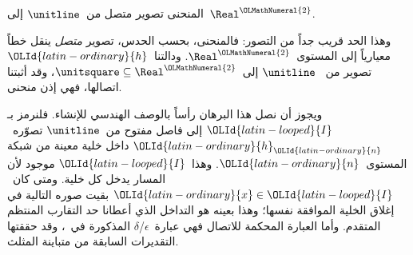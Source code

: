 \documentclass[../../../include/open-logic-section]{subfiles}
\begin{document}
\begin{defn}
المنحنى تصوير متصل من~$\unitline$ إلى~$\Real^{\OLMathNumeral{2}}$.
\end{defn}

وهذا الحد قريب جداً من التصور: فالمنحنى، بحسب الحدس، تصوير \emph{متصل}
ينقل خطاً معيارياً إلى المستوى~$\Real^{\OLMathNumeral{2}}$. ودالتنا~${\OLId{latin-ordinary}{h}}$ تصوير من
~$\unitline$ إلى~$\unitsquare \subseteq \Real^{\OLMathNumeral{2}}$، وقد أثبتنا اتصالها،
فهي إذن منحنى.

ويجوز أن نصل هذا البرهان رأساً بالوصف الهندسي للإنشاء. فلنرمز بـ${\OLId{latin-looped}{I}}$ إلى
فاصل مفتوح من~$\unitline$ تصوّره~${\OLId{latin-ordinary}{h}}_{\OLId{latin-ordinary}{n}}$ داخل خلية معينة من شبكة
المستوى~${\OLId{latin-ordinary}{n}}$. وهذا~${\OLId{latin-looped}{I}}$ موجود لأن المسار يدخل كل خلية. ومتى كان~${\OLId{latin-ordinary}{x}} \in {\OLId{latin-looped}{I}}$
بقيت صوره التالية في إغلاق الخلية الموافقة نفسها؛ وهذا بعينه هو التداخل
الذي أعطانا حد التقارب المنتظم المتقدم. وأما العبارة المحكمة للاتصال فهي
عبارة~$\epsilon$/$\delta$ المذكورة في~، وقد حققتها
التقديرات السابقة من متباينة المثلث.
\end{document}
